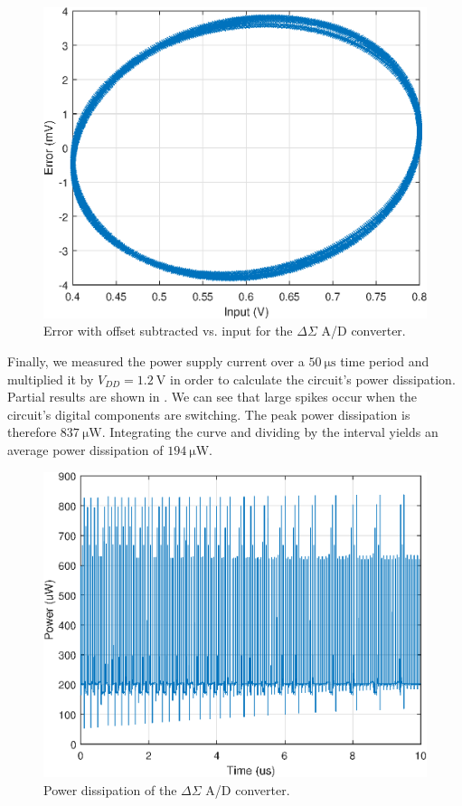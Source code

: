 \documentclass[journal,hidelinks]{IEEEtran}
\begin{document}
\begin{figure}[!htb]
  \centering
  \includegraphics[width=0.8\columnwidth]{circuit/error.eps}
  \caption{Error with offset subtracted vs. input for the $\Delta \Sigma$ A/D converter.}
  \label{fig:error}
\end{figure}

Finally, we measured the power supply current over a $\SI{50}{\micro\second}$ time period and multiplied it by $V_{DD} = \SI{1.2}{\volt}$ in order to calculate the circuit's power dissipation. Partial results are shown in . We can see that large spikes occur when the circuit's digital components are switching. The peak power dissipation is therefore $\SI{837}{\micro\watt}$. Integrating the curve and dividing by the interval yields an average power dissipation of $\SI{194}{\micro\watt}$.

\begin{figure}[!htb]
  \centering
  \includegraphics[width=0.8\columnwidth]{circuit/layout_power.eps}
  \caption{Power dissipation of the $\Delta \Sigma$ A/D converter.}
  \label{fig:layout_power}
\end{figure}
\end{document}
